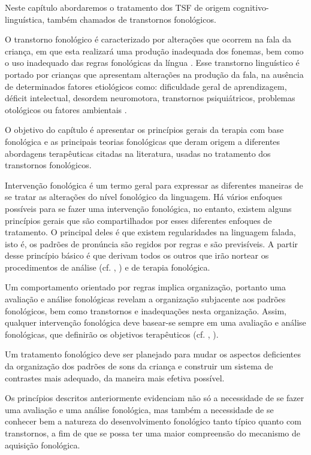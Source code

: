 \documentclass[output=paper,colorlinks,citecolor=brown,booklanguage=portuguese]{langscibook}
\begin{document}
Neste capítulo abordaremos o tratamento dos TSF de origem cognitivo-linguís\-ti\-ca, também chamados de transtornos fonológicos.

O transtorno fonológico é caracterizado por alterações que ocorrem na fala da criança, em que esta realizará uma produção inadequada dos fonemas, bem como o uso inadequado das regras fonológicas da língua \citep{Wertzner2002}. Esse transtorno linguístico é portado por crianças que apresentam alterações na produção da fala, na ausência de determinados fatores etiológicos como: dificuldade geral de aprendizagem, déficit intelectual, desordem neuromotora, transtornos psiquiátricos, problemas otológicos ou fatores ambientais \citep{Mota1996}. 

O objetivo do capítulo é apresentar os princípios gerais da terapia com base fonológica e as principais teorias fonológicas que deram origem a diferentes abordagens terapêuticas citadas na literatura, usadas no tratamento dos transtornos fonológicos.  

Intervenção fonológica é um termo geral para expressar as diferentes maneiras de se tratar as alterações do nível fonológico da linguagem. Há vários enfoques possíveis para se fazer uma intervenção fonológica, no entanto, existem alguns princípios gerais que são compartilhados por esses diferentes enfoques de tratamento. O principal deles é que existem regularidades na linguagem falada, isto é, os padrões de pronúncia são regidos por regras e são previsíveis. A partir desse princípio básico é que derivam todos os outros que irão nortear os procedimentos de análise (cf. , ) e de terapia fonológica. 

Um comportamento orientado por regras implica organização, portanto uma avaliação e análise fonológicas revelam a organização subjacente aos padrões fonológicos, bem como transtornos e inadequações nesta organização. Assim, qualquer intervenção fonológica deve basear-se sempre em uma avaliação e análise fonológicas, que definirão os objetivos terapêuticos (cf. , ).

Um tratamento fonológico deve ser planejado para mudar os aspectos deficientes da organização dos padrões de sons da criança e construir um sistema de contrastes mais adequado, da maneira mais efetiva possível. 

Os princípios descritos anteriormente evidenciam não só a necessidade de se fazer uma avaliação e uma análise fonológica, mas também a necessidade de se conhecer bem a natureza do desenvolvimento fonológico tanto típico quanto com transtornos, a fim de que se possa ter uma maior compreensão do mecanismo de aquisição fonológica.
\end{document}
